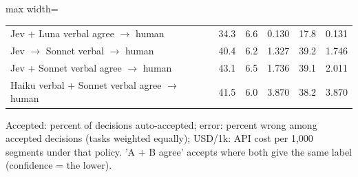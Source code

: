 \begin{table}[t]
\begin{adjustbox}{max width=\linewidth}
\begin{tabular}{lrrlrl}
Jev + Luna verbal agree $\rightarrow$ human & 34.3 & 6.6 & 0.130 & 17.8 & 0.131 \\
Jev $\rightarrow$ Sonnet verbal $\rightarrow$ human & 40.4 & 6.2 & 1.327 & 39.2 & 1.746 \\
Jev + Sonnet verbal agree $\rightarrow$ human & 43.1 & 6.5 & 1.736 & 39.1 & 2.011 \\
Haiku verbal + Sonnet verbal agree $\rightarrow$ human & 41.5 & 6.0 & 3.870 & 38.2 & 3.870 \\
\bottomrule
\end{tabular}
\end{adjustbox}
\par\smallskip\footnotesize\raggedright Accepted: percent of decisions auto-accepted; error: percent wrong among accepted decisions (tasks weighted equally); USD/1k: API cost per 1,000 segments under that policy. 'A + B agree' accepts where both give the same label (confidence = the lower).
\end{table}
